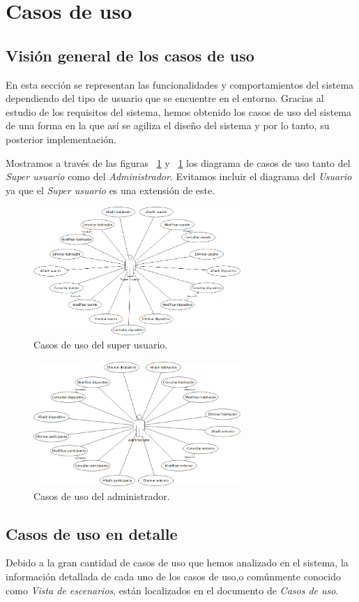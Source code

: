 \section{Casos de uso}
\subsection{Visión general de los casos de uso}
En esta sección se representan las funcionalidades y comportamientos del sistema dependiendo del tipo de usuario que se encuentre en el entorno. Gracias al estudio de los requisitos del sistema, hemos obtenido los casos de uso del sistema de una forma en la que así se agiliza el diseño del sistema y por lo tanto, su posterior implementación.
 
Mostramos a través de las figuras ~\ref{fig:cuSuperusuario} y ~\ref{fig:cuSuperusuario} los diagrama de casos de uso tanto del \textit{Super usuario} como del \textit{Administrador}. Evitamos incluir el diagrama del \textit{Usuario} ya que el \textit{Super usuario} es una extensión de este.

\begin{figure}[h!]
	\centering
	\includegraphics[width=0.7\textwidth]{4.Disenio/Imagenes/CU-Superusuario}
	\caption{Casos de uso del super usuario.}
	\label{fig:cuSuperusuario}
\end{figure}

\begin{figure}[h!]
	\centering
	\includegraphics[width=0.7\textwidth]{4.Disenio/Imagenes/CU-Admin}
	\caption{Casos de uso del administrador.}
	\label{fig:cuAdmin}
\end{figure}


\subsection{Casos de uso en detalle}
Debido a la gran cantidad de casos de uso que hemos analizado en el sistema, la información detallada de cada uno de los casos de uso,o comúnmente conocido como \textit{Vista de escenarios}, están localizados en el documento de \textit{Casos de uso}.